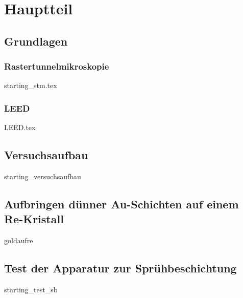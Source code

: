 \documentclass[a4paper,11pt,oneside,final,german,openbib,pdftex]{scrbook}
\begin{document}
\chapter{Hauptteil}


\section{Grundlagen}

% 
\subsection{Rastertunnelmikroskopie}
{starting_stm.tex}
 \subsection{LEED}
 {LEED.tex}


 \section{Versuchsaufbau} 
 {starting_versuchsaufbau}
 
\section{Aufbringen dünner Au-Schichten auf einem Re-Kristall}
{goldaufre}
 
\section{Test der Apparatur zur Sprühbeschichtung} \label{kaptest}
{starting_test_sb}



% 
\end{document}
